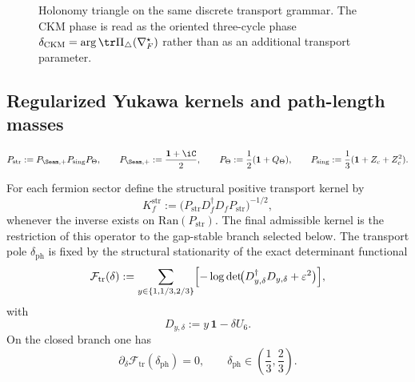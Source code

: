 \begin{figure}[t]
\centering
\scriptsize
{}
\caption{Holonomy triangle on the same discrete transport grammar. The CKM phase is read as the
oriented three-cycle phase $\delta_{\mathrm{CKM}}=\arg\tr\Pi_\triangle(\nabla_F^\star)$ rather
than as an additional transport parameter.}
\label{fig:holonomy-triangle}
\end{figure}

\subsection{Regularized Yukawa kernels and path-length masses}

\[
P_{\mathrm{str}}:=P_{\Seam,+}P_{\mathrm{sing}}P_\Theta,
\qquad
P_{\Seam,+}:=\frac{\mathbf 1+\iC}{2},
\qquad
P_\Theta:=\frac12(\mathbf 1+Q_\Theta),
\qquad
P_{\mathrm{sing}}:=\frac13(\mathbf 1+Z_c+Z_c^2).
\]

\begin{definition}
\label{def:structural-transport-kernel}
For each fermion sector define the structural positive transport kernel by
\[
K_f^{\mathrm{str}}:=\bigl(P_{\mathrm{str}} D_f^\dagger D_f P_{\mathrm{str}}\bigr)^{-1/2},
\]
whenever the inverse exists on $\mathrm{Ran}(P_{\mathrm{str}})$. The final admissible kernel is
the restriction of this operator to the gap-stable branch selected below. The transport pole
$\delta_{\mathrm{ph}}$ is fixed by the structural stationarity of the exact determinant functional
\[
\mathcal F_{\mathrm{tr}}(\delta)
:=
\sum_{y\in\{1,1/3,2/3\}}
\Bigl[-\log\det\!\bigl(D_{y,\delta}^\dagger D_{y,\delta}+\varepsilon^2\bigr)\Bigr],
\]
with
\[
D_{y,\delta}:=y\,\mathbf 1-\delta U_6.
\]
On the closed branch one has
\begin{equation}
\label{eq:transport-bridge-offset}
\partial_\delta \mathcal F_{\mathrm{tr}}(\delta_{\mathrm{ph}})=0,
\qquad
\delta_{\mathrm{ph}}\in\left(\frac13,\frac23\right).
\end{equation}
\end{definition}

